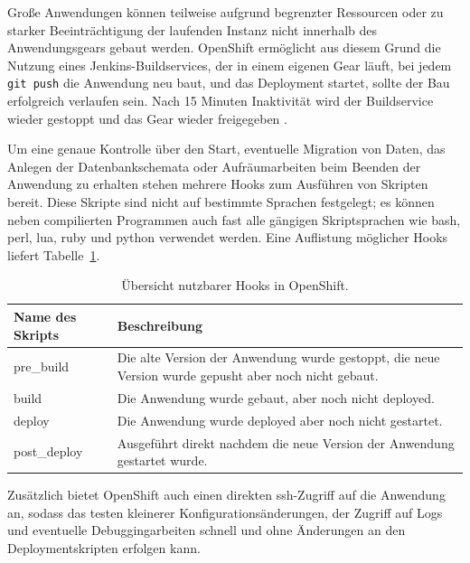 \documentclass[10pt,a4paper,compsoc]{IEEEtran}
\begin{document}
Große Anwendungen können teilweise aufgrund begrenzter Ressourcen oder zu starker Beeinträchtigung der laufenden Instanz nicht innerhalb des Anwendungsgears gebaut werden. OpenShift ermöglicht aus diesem Grund die Nutzung eines Jenkins-Buildservices, der in einem eigenen Gear läuft, bei jedem \verb!git push! die Anwendung neu baut, und das Deployment startet, sollte der Bau erfolgreich verlaufen sein.
Nach 15 Minuten Inaktivität wird der Buildservice wieder gestoppt und das Gear wieder freigegeben \cite[S.45]{os_user_guide}.

Um eine genaue Kontrolle über den Start, eventuelle Migration von Daten, das Anlegen der Datenbankschemata oder Aufräumarbeiten beim Beenden der Anwendung zu erhalten stehen mehrere Hooks zum Ausführen von Skripten bereit. Diese Skripte sind nicht auf bestimmte Sprachen festgelegt; es können neben compilierten Programmen auch fast alle gängigen Skriptsprachen wie bash, perl, lua, ruby und python verwendet werden. Eine Auflistung möglicher Hooks liefert Tabelle~\ref{tab:hooks}.

\begin{table}[htbp]
\centering
\begin{tabularx}{\columnwidth}{lX}
\toprule
Name des Skripts & Beschreibung \\
\midrule
pre\_build & Die alte Version der Anwendung wurde gestoppt, die neue Version wurde gepusht aber noch nicht gebaut. \\
build & Die Anwendung wurde gebaut, aber noch nicht deployed. \\
deploy & Die Anwendung wurde deployed aber noch nicht gestartet. \\
post\_deploy & Ausgeführt direkt nachdem die neue Version der Anwendung gestartet wurde. \\
\bottomrule
\end{tabularx}
\caption{Übersicht nutzbarer Hooks in OpenShift.}
\label{tab:hooks}
\end{table}

Zusätzlich bietet OpenShift auch einen direkten ssh-Zugriff auf die Anwendung an, sodass das testen kleinerer Konfigurationsänderungen, der Zugriff auf Logs und eventuelle Debuggingarbeiten schnell und ohne Änderungen an den Deploymentskripten erfolgen kann.
\end{document}

